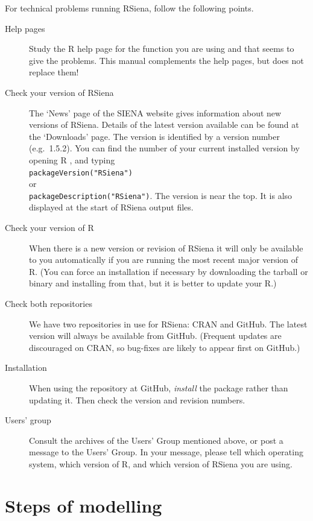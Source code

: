 \documentclass[a4paper,fleqn,11pt]{article}
\newcommand{\+}{\, + \,}
\newcommand{\R}{{\sf R }}
\newcommand{\Rn}{{\sf R}}
\newcommand{\rs}{{\sf RSiena}}
\newcommand{\RS}{{\sf \textsf{RSiena} }}
\newcommand{\SI}{{\sf SIENA }}
\begin{document}
For technical problems running \rs, follow the following points.
\begin{description}
\item[Help pages] Study the \R help page for the function you are using and that seems to give
      the problems. This manual complements the help pages,
      but does not replace them!
\item[Check your version of \RS]
  The `News' page of the \SI website gives information about new versions
  of \rs. Details of the latest version available can
  be found at the `Downloads' page.
  The version is
  identified by a version number (e.g.\ 1.5.2).
  You can find the number of your current installed version by
  opening \R, and typing\\
  \verb|packageVersion("RSiena")|   \\
  or \\
  \verb|packageDescription("RSiena")|. The version is
  near the top. It is also displayed at the
  start of \RS output files.
\item[Check your version of \Rn] When there is a new version or revision of \RS
  it will only be available to you automatically if you are running the most
  recent major version of \Rn. (You can force an installation if
  necessary by downloading the tarball or binary and installing from that, but
  it is better to update your \Rn.)
\item [Check both repositories] We have two repositories in use for \rs: CRAN
  and GitHub. The latest version will always be available from
  GitHub. (Frequent updates are discouraged on CRAN, so bug-fixes are likely to
  appear first on GitHub.)
\item[Installation] When using the repository at GitHub, \emph{install} the
  package rather than updating it. Then check the version and revision numbers.
\item[Users' group] Consult the archives of the Users' Group mentioned above, or post
     a message to the Users' Group. In your message,
     please tell which operating system, which version of \Rn, and which version
     of \RS you are using.
\end{description}

\newpage

\section{Steps of modelling}
\label{S_parts}
\end{document}
